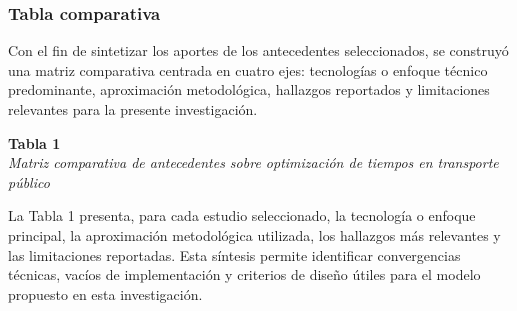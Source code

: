 \subsubsection{Tabla comparativa}

Con el fin de sintetizar los aportes de los antecedentes seleccionados, se construyó una matriz comparativa centrada en cuatro ejes: tecnologías o enfoque técnico predominante, aproximación metodológica, hallazgos reportados y limitaciones relevantes para la presente investigación.

\textbf{Tabla 1}\\
\textit{Matriz comparativa de antecedentes sobre optimización de tiempos en transporte público}

La Tabla 1 presenta, para cada estudio seleccionado, la tecnología o enfoque principal, la aproximación metodológica utilizada, los hallazgos más relevantes y las limitaciones reportadas. Esta síntesis permite identificar convergencias técnicas, vacíos de implementación y criterios de diseño útiles para el modelo propuesto en esta investigación.

